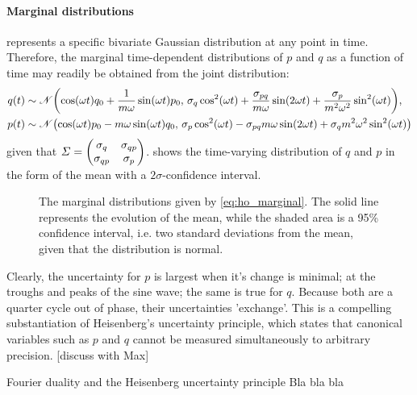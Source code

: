 \paragraph{Marginal distributions}  represents a specific bivariate Gaussian distribution at any point in time. Therefore, the marginal time-dependent distributions of $p$ and $q$ as a function of time may readily be obtained from the joint distribution: \cite{Schon2011}
\begin{equation}
    \begin{split}
        q(t) &\sim \mathscr{N}\qty(\cos(\omega t)q_0 + \frac{1}{m\omega}\sin(\omega t)p_0,\,\sigma_q\cos[2](\omega t) + \frac{\sigma_{pq}}{m\omega}\sin(2\omega t) + \frac{\sigma_p}{m^2\omega^2}\sin[2](\omega t)), \\
        p(t) &\sim \mathscr{N}\qty(\cos(\omega t)p_0 - m\omega\sin(\omega t)q_0,\,\sigma_p\cos[2](\omega t) - \sigma_{pq}m\omega\sin(2\omega t) + \sigma_q m^2\omega^2\sin[2](\omega t))
    \end{split}
    \label{eq:ho_marginal}
\end{equation}
given that $\Sigma = \mqty(\sigma_q & \sigma_{qp}\\\sigma_{qp} & \sigma_p)$.  shows the time-varying distribution of $q$ and $p$ in the form of the mean with a $2\sigma$-confidence interval.
\begin{figure}[h]
    \centering
    
    \caption{The marginal distributions given by \cref{eq:ho_marginal}. The solid line represents the evolution of the mean, while the shaded area is a 95\% confidence interval, i.e. two standard deviations from the mean, given that the distribution is normal.}
    \label{fig:pq_marginal_ho}
\end{figure}
Clearly, the uncertainty for $p$ is largest when it's change is minimal; at the troughs and peaks of the sine wave; the same is true for $q$. Because both are a quarter cycle out of phase, their uncertainties 'exchange'. This is a compelling substantiation of Heisenberg's uncertainty principle, which states that canonical variables such as $p$ and $q$ cannot be measured simultaneously to arbitrary precision. [discuss with Max]
\begin{aside}{Fourier duality and the Heisenberg uncertainty principle}
    Bla bla bla
\end{aside}

